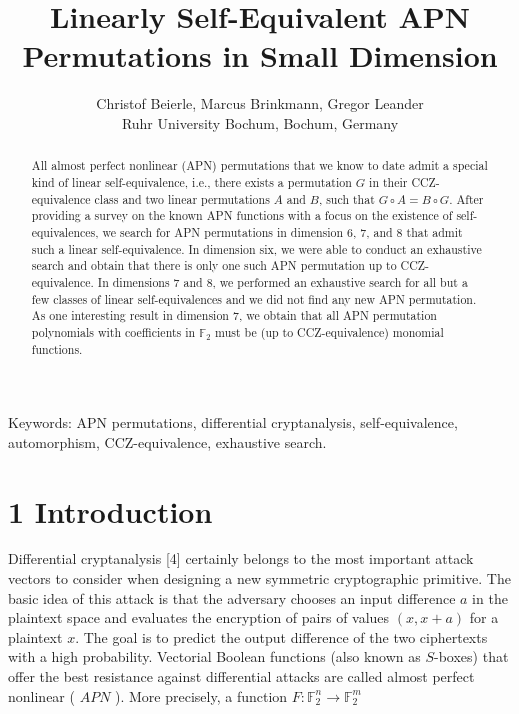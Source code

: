 \documentclass[10pt]{article}
\title{Linearly Self-Equivalent APN Permutations in Small Dimension }
\author{Christof Beierle, Marcus Brinkmann, Gregor Leander\\
Ruhr University Bochum, Bochum, Germany}
\date{}
\begin{document}
\maketitle
\captionsetup{singlelinecheck=false}


\begin{abstract}
All almost perfect nonlinear (APN) permutations that we know to date admit a special kind of linear self-equivalence, i.e., there exists a permutation $G$ in their CCZ-equivalence class and two linear permutations $A$ and $B$, such that $G \circ A=B \circ G$. After providing a survey on the known APN functions with a focus on the existence of self-equivalences, we search for APN permutations in dimension 6, 7, and 8 that admit such a linear self-equivalence. In dimension six, we were able to conduct an exhaustive search and obtain that there is only one such APN permutation up to CCZ-equivalence. In dimensions 7 and 8, we performed an exhaustive search for all but a few classes of linear self-equivalences and we did not find any new APN permutation. As one interesting result in dimension 7, we obtain that all APN permutation polynomials with coefficients in $\mathbb{F}_{2}$ must be (up to CCZ-equivalence) monomial functions.
\end{abstract}

Keywords: APN permutations, differential cryptanalysis, self-equivalence, automorphism, CCZ-equivalence, exhaustive search.

\section*{1 Introduction}
Differential cryptanalysis [4] certainly belongs to the most important attack vectors to consider when designing a new symmetric cryptographic primitive. The basic idea of this attack is that the adversary chooses an input difference $a$ in the plaintext space and evaluates the encryption of pairs of values $(x, x+a)$ for a plaintext $x$. The goal is to predict the output difference of the two ciphertexts with a high probability. Vectorial Boolean functions (also known as $S$-boxes) that offer the best resistance against differential attacks are called almost perfect nonlinear ( $A P N$ ). More precisely, a function $F: \mathbb{F}_{2}^{n} \rightarrow \mathbb{F}_{2}^{m}$
\end{document}

